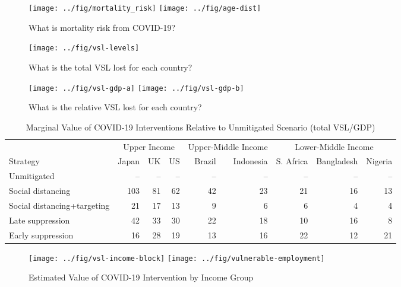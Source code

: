 \documentclass[11pt]{article}
\begin{document}
\clearpage


\begin{figure}[htbp!]
  \centering
  \caption{What is mortality risk from COVID-19?}
  \texttt{[image: ../fig/mortality\_risk]}
    \texttt{[image: ../fig/age-dist]}
  \label{fig:perc-mortality}
\end{figure}


\begin{figure}[htbp!]
  \centering
  \caption{What is the total VSL lost for each country?}
  \texttt{[image: ../fig/vsl-levels]}
  \label{fig:vsl-levels}
\end{figure}


\begin{figure}[htbp!]
  \centering
  \caption{What is the relative VSL lost for each country?}
  \texttt{[image: ../fig/vsl-gdp-a]}
  \texttt{[image: ../fig/vsl-gdp-b]}
  \label{fig:vsl-gdp}
\end{figure}


\begin{table}
\caption{\label{tab:marginal-value-intervention}Marginal Value of COVID-19 Interventions Relative to Unmitigated Scenario (total VSL/GDP)}
\centering
\begin{tabular}[t]{lrrrrrrrr}
\toprule
\multicolumn{1}{c}{ } & \multicolumn{3}{c}{Upper Income} & \multicolumn{2}{c}{Upper-Middle Income} & \multicolumn{3}{c}{Lower-Middle Income} \\
\cmidrule(l{3pt}r{3pt}){2-4} \cmidrule(l{3pt}r{3pt}){5-6} \cmidrule(l{3pt}r{3pt}){7-9}
Strategy & Japan & UK & US & Brazil & Indonesia & S. Africa & Bangladesh & Nigeria\\
\midrule
Unmitigated & -- & -- & -- & -- & -- & -- & -- & --\\
Social distancing & 103 & 81 & 62 & 42 & 23 & 21 & 16 & 13\\
Social distancing+targeting & 21 & 17 & 13 & 9 & 6 & 6 & 4 & 4\\
Late suppression & 42 & 33 & 30 & 22 & 18 & 10 & 16 & 8\\
Early suppression & 16 & 28 & 19 & 13 & 16 & 22 & 12 & 21\\
\bottomrule
\end{tabular}
\end{table}


\begin{figure}[htbp!]
\centering
\label{fig:vsl-employment-income}
\caption{Estimated Value of COVID-19 Intervention by Income Group}
\texttt{[image: ../fig/vsl-income-block]}
\texttt{[image: ../fig/vulnerable-employment]}
\end{figure}






\clearpage
\begin{singlespacing}

\printbibliography

\end{singlespacing}
\end{document}
